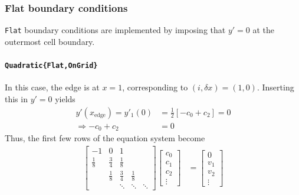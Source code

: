 \documentclass{article}
\begin{document}
\subsubsection{Flat boundary conditions}

\texttt{Flat} boundary conditions are implemented by imposing that $y' = 0$ at the outermost cell boundary.

\paragraph{\texttt{Quadratic\{Flat,OnGrid\}}}
In this case, the edge is at $x=1$, corresponding to $(i,\delta x) = (1,0)$. Inserting this in $y'=0$ yields
\begin{align*}
y'(x_{\text{edge}}) = y'_1(0) &= \frac{1}{2}\left[-c_0 + c_2\right] = 0\\
\Rightarrow - c_0 + c_2 &= 0
\end{align*}
Thus, the first few rows of the equation system become
\begin{align*}
\begin{bmatrix} 
-1 & 0 & 1 \\
\frac{1}{8} & \frac{3}{4} & \frac{1}{8} \\
 & \frac{1}{8} & \frac{3}{4} & \frac{1}{8} \\
 & & \ddots & \ddots & \ddots
\end{bmatrix}
\begin{bmatrix}c_0\\ c_1\\ c_2\\\vdots\end{bmatrix}
&=
\begin{bmatrix}0\\ v_1 \\ v_2 \\\vdots\end{bmatrix}
\end{align*}
\end{document}
